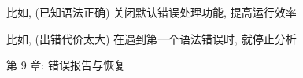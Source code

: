 \begin{frame}{}
  \begin{center}

    \vspace{0.80cm}
    比如, (已知语法正确) 关闭默认错误处理功能, 提高运行效率

    \vspace{0.50cm}
    \vspace{0.50cm}

    比如, (出错代价太大) 在遇到第一个语法错误时, 就停止分析
  \end{center}
\end{frame}

\begin{frame}{}

  \begin{center}
    第 9 章: 错误报告与恢复
  \end{center}
\end{frame}

